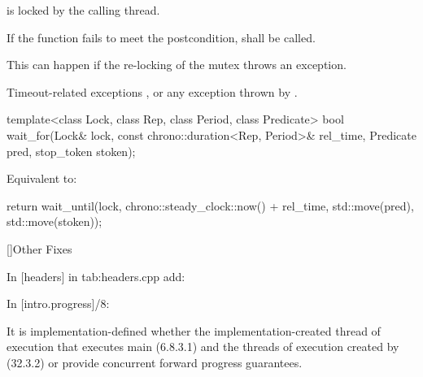 {\begin{itemdescr}
 \pnum \postconditions {} is locked by the calling thread.

 \pnum \remarks
        If the function fails to meet the postcondition, 
        shall be called.
        \begin{note} This can happen if the re-locking of the mutex throws an exception. \end{note}

 \pnum \throws 
        Timeout-related exceptions ,
        or any exception thrown by .

\end{itemdescr}



\begin{itemdecl}
template<class Lock, class Rep, class Period, class Predicate>
  bool wait_for(Lock& lock,
                const chrono::duration<Rep, Period>& rel_time,
                Predicate pred,
                stop_token stoken);
\end{itemdecl}
\begin{itemdescr}
 \pnum \effects Equivalent to:
\begin{codeblock}
return wait_until(lock, chrono::steady_clock::now() + rel_time, std::move(pred), std::move(stoken));
\end{codeblock}
\end{itemdescr}

}%


\clearpage

[]{Other Fixes}

{\color{blue}
In [headers] in tab:headers.cpp add:
}



{\color{blue}
In [intro.progress]/8:
}

It is implementation-defined whether the implementation-created thread of execution that executes main
(6.8.3.1) and the threads of execution created by  (32.3.2) 
{\color{insertcolor}
or  
}%
provide concurrent forward progress
guarantees.


